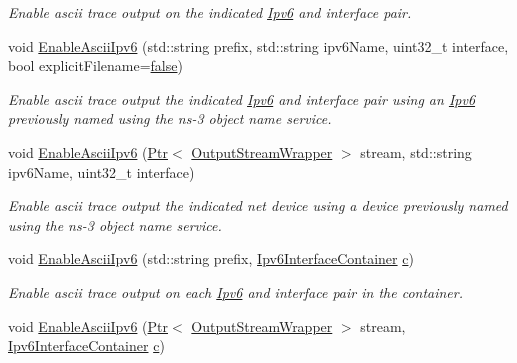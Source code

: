 \begin{DoxyCompactItemize}
\begin{DoxyCompactList}\small\item\em Enable ascii trace output on the indicated \hyperlink{classns3_1_1Ipv6}{Ipv6} and interface pair. \end{DoxyCompactList}\item 
void \hyperlink{classns3_1_1AsciiTraceHelperForIpv6_a3f008ab91f7e7fa7daf2d011711985ae}{Enable\+Ascii\+Ipv6} (std\+::string prefix, std\+::string ipv6\+Name, uint32\+\_\+t interface, bool explicit\+Filename=\hyperlink{lte__cqi__generation_8m_ab1bef239d413c4da139c4bac92cd657a}{false})
\begin{DoxyCompactList}\small\item\em Enable ascii trace output the indicated \hyperlink{classns3_1_1Ipv6}{Ipv6} and interface pair using an \hyperlink{classns3_1_1Ipv6}{Ipv6} previously named using the ns-\/3 object name service. \end{DoxyCompactList}\item 
void \hyperlink{classns3_1_1AsciiTraceHelperForIpv6_aad26f35e6196c410a581360bf710d3ad}{Enable\+Ascii\+Ipv6} (\hyperlink{classns3_1_1Ptr}{Ptr}$<$ \hyperlink{classns3_1_1OutputStreamWrapper}{Output\+Stream\+Wrapper} $>$ stream, std\+::string ipv6\+Name, uint32\+\_\+t interface)
\begin{DoxyCompactList}\small\item\em Enable ascii trace output the indicated net device using a device previously named using the ns-\/3 object name service. \end{DoxyCompactList}\item 
void \hyperlink{classns3_1_1AsciiTraceHelperForIpv6_a1eb66049203ae0488459ddace157f8ef}{Enable\+Ascii\+Ipv6} (std\+::string prefix, \hyperlink{classns3_1_1Ipv6InterfaceContainer}{Ipv6\+Interface\+Container} \hyperlink{mmwave_2model_2fading-traces_2fading__trace__generator_8m_ae0323a9039add2978bf5b49550572c7c}{c})
\begin{DoxyCompactList}\small\item\em Enable ascii trace output on each \hyperlink{classns3_1_1Ipv6}{Ipv6} and interface pair in the container. \end{DoxyCompactList}\item 
void \hyperlink{classns3_1_1AsciiTraceHelperForIpv6_a6b19430476ccecfddafe74619b68094d}{Enable\+Ascii\+Ipv6} (\hyperlink{classns3_1_1Ptr}{Ptr}$<$ \hyperlink{classns3_1_1OutputStreamWrapper}{Output\+Stream\+Wrapper} $>$ stream, \hyperlink{classns3_1_1Ipv6InterfaceContainer}{Ipv6\+Interface\+Container} \hyperlink{mmwave_2model_2fading-traces_2fading__trace__generator_8m_ae0323a9039add2978bf5b49550572c7c}{c})

\end{DoxyCompactItemize}

